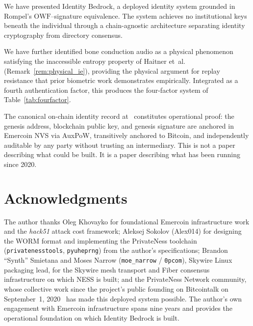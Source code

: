 \documentclass[11pt,a4paper]{article}
\theoremstyle{definition}
\newcommand{\OWF}{\mathrm{OWF}}
\newcommand{\BD}{\textsf{Identity Bedrock}}
\begin{document}
We have presented \BD{}, a deployed identity system grounded in
Rompel's $\OWF$--signature equivalence. The system achieves no
institutional keys beneath the individual through a chain-agnostic
architecture separating identity cryptography from directory
consensus.

We have further identified bone conduction audio as a physical
phenomenon satisfying the inaccessible entropy property of Haitner
et~al.~\cite{Haitner10} (Remark~\ref{rem:physical_ie}), providing
the physical argument for replay resistance that prior biometric work
demonstrates empirically. Integrated as a fourth authentication
factor, this produces the four-factor system of
Table~\ref{tab:fourfactor}.

The canonical on-chain identity record at~\cite{DPO} constitutes
operational proof: the genesis address, blockchain public key, and
genesis signature are anchored in Emercoin NVS via AuxPoW,
transitively anchored to Bitcoin, and independently auditable by
any party without trusting an intermediary. This is not a paper
describing what could be built. It is a paper describing what has
been running since 2020.

\section*{Acknowledgments}

The author thanks Oleg Khovayko for foundational Emercoin
infrastructure work and the \emph{hack51} attack cost framework;
Aleksej Sokolov (Alex014) for designing the WORM format and
implementing the PrivateNess toolchain (\texttt{privatenesstools},
\texttt{pyuheprng}) from the author's specifications; Brandon
``Synth'' Smietana and Moses Narrow (\texttt{moe\_narrow} /
\texttt{0pcom}), Skywire Linux packaging lead, for the Skywire mesh
transport and Fiber consensus infrastructure on which NESS is built;
and the PrivateNess Network community, whose collective work since
the project's public founding on Bitcointalk on September~1,
2020~\cite{BTCTalk20} has made this deployed system possible. The
author's own engagement with Emercoin infrastructure spans nine
years and provides the operational foundation on which \BD{} is
built.
\end{document}
